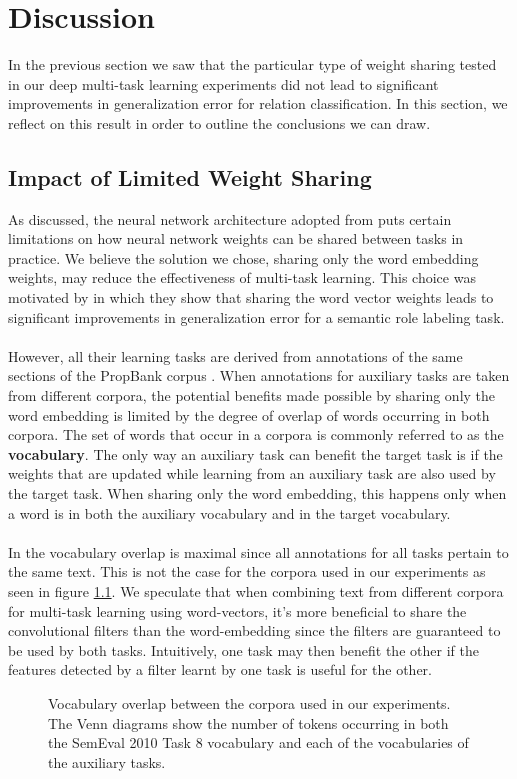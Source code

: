 \chapter{Discussion}
In the previous section we saw that the particular type of weight sharing tested in our deep multi-task learning experiments did not lead to significant improvements in generalization error for relation classification. In this section, we reflect on this result in order to outline the conclusions we can draw.

\section{Impact of Limited Weight Sharing}
As discussed, the neural network architecture adopted from \citet{nguyen2015} puts certain limitations on how neural network weights can be shared between tasks in practice. We believe the solution we chose, sharing only the word embedding weights, may reduce the effectiveness of multi-task learning. This choice was motivated by \citet{collobert2008} in which they show that sharing the word vector weights leads to significant improvements in generalization error for a semantic role labeling task. 
\\\\
However, all their learning tasks are derived from annotations of the same sections of the PropBank corpus \citep{kingsbury2002}. When annotations for auxiliary tasks are taken from different corpora, the potential benefits made possible by sharing only the word embedding is limited by the degree of overlap of words occurring in both corpora. The set of words that occur in a corpora is commonly referred to as the \textbf{vocabulary}. The only way an auxiliary task can benefit the target task is if the weights that are updated while learning from an auxiliary task are also used by the target task. When sharing only the word embedding, this happens only when a word is in both the auxiliary vocabulary and in the target vocabulary.
\\\\
In \citet{collobert2008} the vocabulary overlap is maximal since all annotations for all tasks pertain to the same text. This is not the case for the corpora used in our experiments as seen in figure \ref{vocab_overlap}. We speculate that when combining text from different corpora for multi-task learning using word-vectors, it's more beneficial to share the convolutional filters than the word-embedding since the filters are guaranteed to be used by both tasks. Intuitively, one task may then benefit the other if the features detected by a filter learnt by one task is useful for the other.
\newpage
\thispagestyle{empty}
\begin{figure}
	\centering
	
	
	
	\caption{Vocabulary overlap between the corpora used in our experiments. The Venn diagrams show the number of tokens occurring in both the SemEval 2010 Task 8 vocabulary and each of the vocabularies of the auxiliary tasks.}
	\label{vocab_overlap}
\end{figure}
\FloatBarrier

